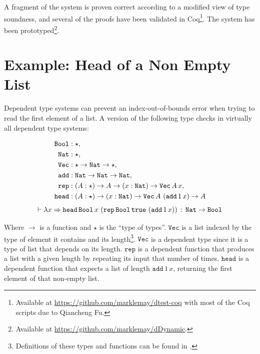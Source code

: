 A fragment of the system is proven correct according to a modified view of type soundness, and several of the proofs have been validated in Coq\footnote{
  Available at \url{https://github.com/marklemay/dtest-coq} with most of the Coq scripts due to Qiancheng Fu.
}.
The system has been prototyped\footnote{
  Available at \url{https://github.com/marklemay/dDynamic}.
}.

\section{Example: Head of a Non Empty List}

Dependent type systems can prevent an index-out-of-bounds error when trying to read the first element of a list.
A version of the following type checks in virtually all dependent type systems:


\begin{align*}
\mathtt{Bool} & : \star,\\
\mathtt{Nat}{}  & : \star,\\
\mathtt{Vec} & :\star \rightarrow\mathtt{Nat}{} \rightarrow \star,\\
\mathtt{add} & :\mathtt{Nat}{} \rightarrow\mathtt{Nat}{} \rightarrow\mathtt{Nat}{} ,\\
\mathtt{rep} & :\left(A:\star\right)\rightarrow A\rightarrow\left(x:\mathtt{Nat}{} \right)\rightarrow\mathtt{Vec\,}A\,x,\\
\mathtt{head} & :\left(A:\star\right)\rightarrow\left(x:\mathtt{Nat}{} \right)\rightarrow\mathtt{Vec}\,A\,\left(\mathtt{add}\,1\,x\right)\rightarrow A
\end{align*}
\[
\vdash\lambda x\Rightarrow\mathtt{head}\,\mathtt{Bool}\,x\,\left(\mathtt{rep}\,\mathtt{Bool}\,\mathtt{true}\,\left(\mathtt{add}\,1\,x\right)\right)\,:\,\mathtt{Nat}{} \rightarrow\mathtt{Bool}
\]


Where $\rightarrow$ is a function and $\star$ is the ``type of types''.
$\mathtt{Vec}$ is a list indexed by the type of element it contains and its length\footnote{
  Definitions of these types and functions can be found in .
}.
$\mathtt{Vec}$ is a dependent type since it is a type of list that depends on its length.
$\mathtt{rep}$ is a dependent function that produces a list with a given length by repeating its input that number of times.
$\mathtt{head}$ is a dependent function that expects a list of length $\mathtt{add}\,1\,x$, returning the first element of that non-empty list.

